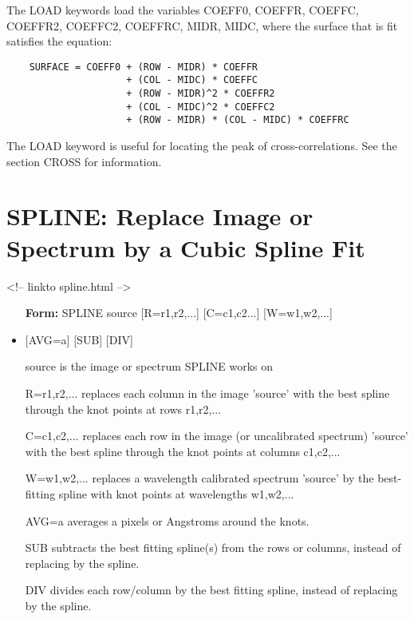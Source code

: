 The LOAD keywords load the variables COEFF0, COEFFR, COEFFC, COEFFR2,
COEFFC2, COEFFRC, MIDR, MIDC, where the surface that is fit satisfies the
equation:
\begin{verbatim}
    SURFACE = COEFF0 + (ROW - MIDR) * COEFFR
                     + (COL - MIDC) * COEFFC
                     + (ROW - MIDR)^2 * COEFFR2
                     + (COL - MIDC)^2 * COEFFC2
                     + (ROW - MIDR) * (COL - MIDC) * COEFFRC
\end{verbatim}
The LOAD keyword is useful for locating the peak of cross-correlations.
See the section CROSS for information.

\section{SPLINE: Replace Image or Spectrum by a Cubic Spline Fit}
\begin{rawhtml}
<!-- linkto spline.html -->
\end{rawhtml}

\begin{itemize}
  \item[\textbf{Form: } SPLINE source {[R=r1,r2,...]} {[C=c1,c2...]} 
       {[W=w1,w2,...]}\hfill]{}
  \item{{[AVG=a]} {[SUB]} {[DIV]}}
  \item[source]{is the image or spectrum SPLINE works on}
  \item[R=r1,r2,...]{replaces each column in the image 'source'
       with the best spline through the knot points at rows r1,r2,...}
  \item[C=c1,c2,...]{replaces each row in the image (or uncalibrated 
       spectrum) 'source' with the best spline 
       through the knot points at columns c1,c2,...}
  \item[W=w1,w2,...]{replaces a wavelength calibrated spectrum
       'source' by the best-fitting spline with knot
       points at wavelengths w1,w2,...}
  \item[AVG=a]{averages a pixels or Angstroms around the knots.}
  \item[SUB]{subtracts the best fitting spline(s) from the 
       rows or columns, instead of replacing by the spline.}
  \item[DIV]{divides each row/column by the best fitting
       spline, instead of replacing by the spline.}
\end{itemize}

